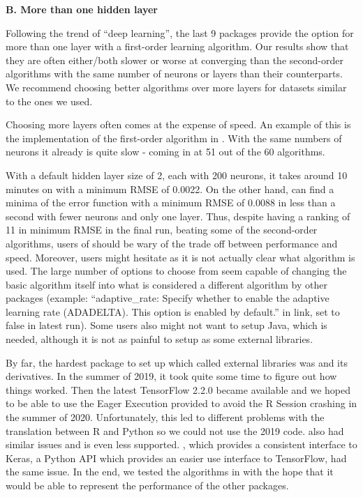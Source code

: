 \textbf{B. More than one hidden layer}

Following the trend of ``deep learning'', the last 9 packages provide
the option for more than one layer with a first-order learning
algorithm. Our results show that they are often either/both slower or
worse at converging than the second-order algorithms with the same
number of neurons or layers than their counterparts. We recommend
choosing better algorithms over more layers for datasets similar to the
ones we used.

Choosing more layers often comes at the expense of speed. An example of
this is the implementation of the first-order algorithm in 
\citep{R-h2o}. With the same numbers of neurons it already is quite slow
- coming in at 51 out of the 60 algorithms.

With a default hidden layer size of 2, each with 200 neurons, it takes
around 10 minutes on  with a minimum RMSE of 0.0022. On
the other hand,  can find a minima of the error function with
a minimum RMSE of 0.0088 in less than a second with fewer neurons and
only one layer. Thus, despite having a ranking of 11 in minimum RMSE in
the final run, beating some of the second-order algorithms, users of
 should be wary of the trade off between performance and speed.
Moreover, users might hesitate as it is not actually clear what
algorithm is used. The large number of options to choose from seem
capable of changing the basic algorithm itself into what is considered a
different algorithm by other packages (example: ``adaptive\_rate:
Specify whether to enable the adaptive learning rate (ADADELTA). This
option is enabled by default.'' in link, set to false in latest run).
Some users also might not want to setup Java, which is needed, although
it is not as painful to setup as some external libraries.

By far, the hardest package to set up which called external libraries
was  \citep{R-tensorflow} and its derivatives. In
the summer of 2019, it took quite some time to figure out how things
worked. Then the latest TensorFlow 2.2.0 became available and we hoped
to be able to use the Eager Execution provided to avoid the R Session
crashing in the summer of 2020. Unfortunately, this led to different
problems with the translation between R and Python so we could not use
the 2019 code.  \citep{R-tfestimators} also had
similar issues and is even less supported. 
\citep{R-kerasR}, which provides a consistent interface to Keras, a
Python API which provides an easier use interface to TensorFlow, had the
same issue. In the end, we tested the algorithms in 
\citep{R-keras} with the hope that it would be able to represent the
performance of the other packages.

